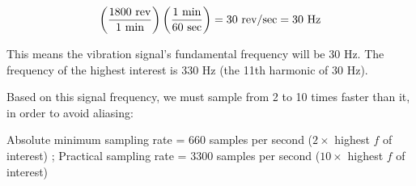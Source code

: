 $$\left(1800 \hbox{ rev} \over 1 \hbox{ min} \right) \left(1 \hbox{ min} \over 60 \hbox{ sec} \right) = 30 \hbox{ rev/sec} = 30 \hbox{ Hz}$$

This means the vibration signal's fundamental frequency will be 30 Hz.  The frequency of the highest interest is 330 Hz (the 11th harmonic of 30 Hz).

\vskip 30pt

Based on this signal frequency, we must sample from 2 to 10 times faster than it, in order to avoid aliasing:

\vskip 10pt

Absolute minimum sampling rate = 660 samples per second ($2 \times$ highest $f$ of interest) ; Practical sampling rate = 3300 samples per second ($10 \times$ highest $f$ of interest)




